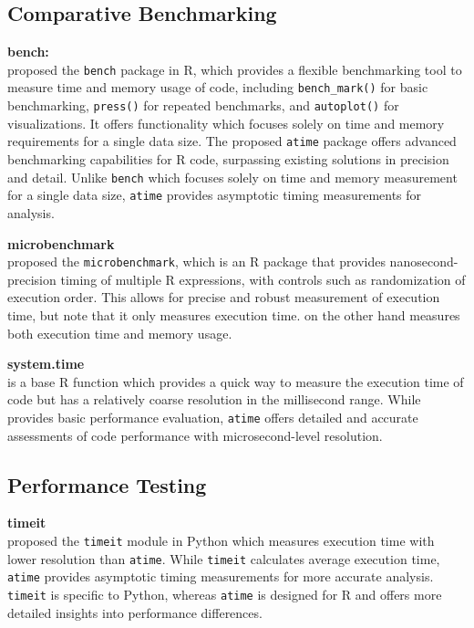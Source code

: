 \subsection{Comparative Benchmarking}

\textbf{bench:} \\
\citet{bench} proposed the \texttt{bench} package in R, which provides a flexible benchmarking tool to measure time and memory usage of code, including \texttt{bench\_mark()} for basic benchmarking, \texttt{press()} for repeated benchmarks, and \texttt{autoplot()} for visualizations. It offers functionality which focuses solely on time and memory requirements for a single data size. The proposed \texttt{atime} package offers advanced benchmarking capabilities for R code, surpassing existing solutions in precision and detail. Unlike \texttt{bench} which focuses solely on time and memory measurement for a single data size, \texttt{atime} provides asymptotic timing measurements for analysis.
\vspace{0.1in}

\textbf{microbenchmark} \\
\citet{microbenchmark} proposed the \texttt{microbenchmark}, which is an R package that provides nanosecond-precision timing of multiple R expressions, with controls such as randomization of execution order. This allows for precise and robust measurement of execution time, but note that it only measures execution time.  on the other hand measures both execution time and memory usage.
\vspace{0.1in}

\textbf{system.time} \\
\citet{system.time} is a base R function which provides a quick way to measure the execution time of code but has a relatively coarse resolution in the millisecond range.  While \citet{system.time} provides basic performance evaluation, \texttt{atime} offers detailed and accurate assessments of code performance with microsecond-level resolution.
\vspace{0.1in}

\subsection{Performance Testing}
\textbf{timeit} \\
\citet{timeit} proposed the \texttt{timeit} module in Python which measures execution time with lower resolution than \texttt{atime}. While \texttt{timeit} calculates average execution time, \texttt{atime} provides asymptotic timing measurements for more accurate analysis. \texttt{timeit} is specific to Python, whereas \texttt{atime} is designed for R and offers more detailed insights into performance differences.
\vspace{0.1in}

